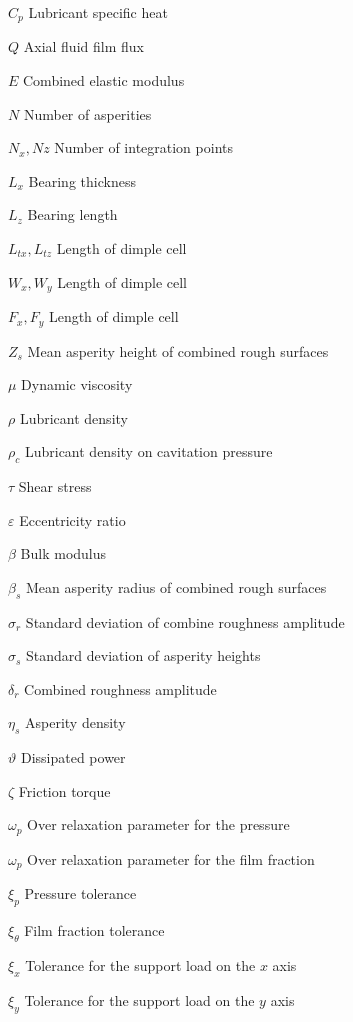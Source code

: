 \begin{simbolos}
	\item[$ C_p $] Lubricant specific heat
	\item[$ Q $] Axial fluid film flux
	\item[$ E $] Combined elastic modulus
	\item[$ N $] Number of asperities
	\item[$ N_x, Nz $] Number of integration points
	\item[$ L_x $] Bearing thickness
	\item[$ L_z $] Bearing length
	\item[$ L_{tx}, L_{tz} $] Length of dimple cell	
	\item[$ W_x, W_y $] Length of dimple cell	
	\item[$ F_x, F_y $] Length of dimple cell			
	\item[$ Z_s $] Mean asperity height of combined rough surfaces	
	\item[$ \mu $] Dynamic viscosity
	\item[$ \rho $] Lubricant density
	\item[$ \rho_c $] Lubricant density on cavitation pressure
	\item[$ \tau $] Shear stress
	\item[$ \varepsilon $] Eccentricity ratio
	\item[$ \beta $] Bulk modulus
	\item[$ \beta_s $] Mean asperity radius of combined rough surfaces
	\item[$ \sigma_r $] Standard deviation of combine roughness amplitude 
	\item[$ \sigma_s $] Standard deviation of asperity heights 
	\item[$ \delta_r $] Combined roughness amplitude
	\item[$ \eta_s $] Asperity density
	\item[$ \vartheta $] Dissipated power
	\item[$ \zeta $] Friction torque
	\item[$ \omega_p $] Over relaxation parameter for the pressure
	\item[$ \omega_p $] Over relaxation parameter for the film fraction
	\item[$ \xi_{p} $] Pressure tolerance
	\item[$ \xi_{\theta} $] Film fraction tolerance
	\item[$ \xi_{x} $] Tolerance for the support load on the $x$ axis
	\item[$ \xi_{y} $] Tolerance for the support load on the $y$ axis

\end{simbolos}
